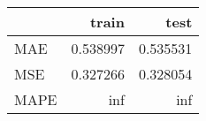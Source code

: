 \begin{tabular}{lrr}
\toprule
{} &     train &      test \\
\midrule
MAE  &  0.538997 &  0.535531 \\
MSE  &  0.327266 &  0.328054 \\
MAPE &       inf &       inf \\
\bottomrule
\end{tabular}
